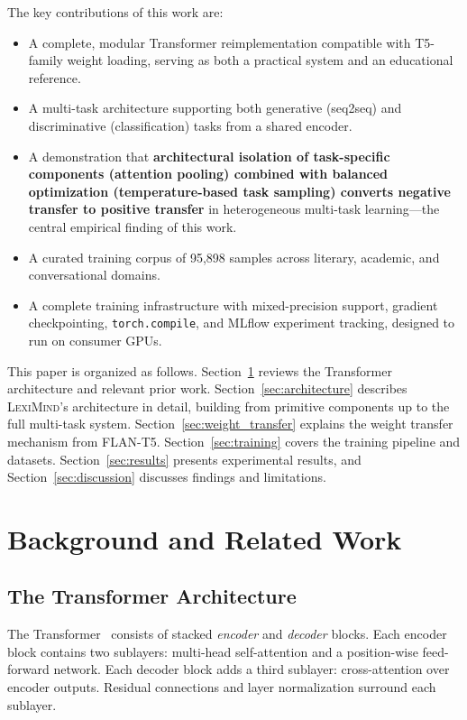 \documentclass[11pt,a4paper]{article}
\newcommand{\lexiname}{\textsc{LexiMind}}
\newcommand{\tflant}{FLAN-T5}
\begin{document}
The key contributions of this work are:
\begin{itemize}[nosep]
    \item A complete, modular Transformer reimplementation compatible with T5-family weight loading, serving as both a practical system and an educational reference.
    \item A multi-task architecture supporting both generative (seq2seq) and discriminative (classification) tasks from a shared encoder.
    \item A demonstration that \textbf{architectural isolation of task-specific components (attention pooling) combined with balanced optimization (temperature-based task sampling) converts negative transfer to positive transfer} in heterogeneous multi-task learning---the central empirical finding of this work.
    \item A curated training corpus of 95,898 samples across literary, academic, and conversational domains.
    \item A complete training infrastructure with mixed-precision support, gradient checkpointing, \texttt{torch.compile}, and MLflow experiment tracking, designed to run on consumer GPUs.
\end{itemize}

This paper is organized as follows.
Section~\ref{sec:background} reviews the Transformer architecture and relevant prior work.
Section~\ref{sec:architecture} describes \lexiname{}'s architecture in detail, building from primitive components up to the full multi-task system.
Section~\ref{sec:weight_transfer} explains the weight transfer mechanism from \tflant{}.
Section~\ref{sec:training} covers the training pipeline and datasets.
Section~\ref{sec:results} presents experimental results, and Section~\ref{sec:discussion} discusses findings and limitations.

\section{Background and Related Work}
\label{sec:background}

\subsection{The Transformer Architecture}

The Transformer~\citep{vaswani2017attention} consists of stacked \emph{encoder} and \emph{decoder} blocks.
Each encoder block contains two sublayers: multi-head self-attention and a position-wise feed-forward network.
Each decoder block adds a third sublayer: cross-attention over encoder outputs.
Residual connections and layer normalization surround each sublayer.
\end{document}
